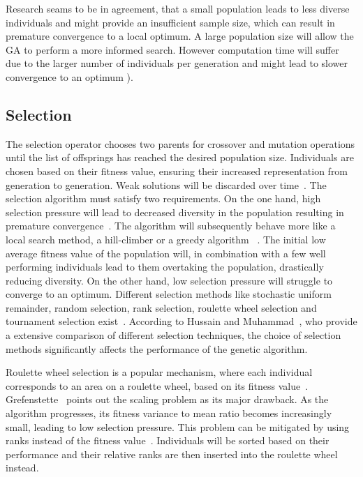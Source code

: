 Research seams to be in agreement, that a small population leads to less diverse individuals and might provide an insufficient sample size, which can result in premature convergence to a local optimum. A large population size will allow the GA to perform a more informed search. However computation time will suffer due to the larger number of individuals per generation and might lead to slower convergence to an optimum \cite{grefenstette_optimization_1986, katoch_review_2021, kacprzyk_parameter_2007}).

\subsection{Selection}
The selection operator chooses two parents for crossover and mutation operations until the list of offsprings has reached the desired population size. Individuals are chosen based on their fitness value, ensuring their increased representation from generation to generation. Weak solutions will be discarded over time~\cite{srinivas_genetic_1994}. The selection algorithm must satisfy two requirements. On the one hand, high selection pressure will lead to decreased diversity in the population resulting in premature convergence~\cite{katoch_review_2021}. The algorithm will subsequently behave more like a local search method, a hill-climber or a greedy algorithm ~\cite{kacprzyk_parameter_2007}. The initial low average fitness value of the population will, in combination with a few well performing individuals lead to them overtaking the population, drastically reducing diversity. On the other hand, low selection pressure will struggle to converge to an optimum. Different selection methods like stochastic uniform remainder, random selection, rank selection, roulette wheel selection and tournament selection exist~\cite{majumdar_genetic_2015}. According to Hussain and Muhammad~\cite{hussain_trade-off_2020}, who provide a extensive comparison of different selection techniques, the choice of selection methods significantly affects the performance of the genetic algorithm.

Roulette wheel selection is a popular mechanism, where each individual corresponds to an area on a roulette wheel, based on its fitness value~\cite{holland_adaptation_1992}. Grefenstette~\cite{grefenstette_optimization_1986} points out the scaling problem as its major drawback. As the algorithm progresses, its fitness variance to mean ratio becomes increasingly small, leading to low selection pressure. This problem can be mitigated by using ranks instead of the fitness value~\cite{katoch_review_2021}. Individuals will be sorted based on their performance and their relative ranks are then inserted into the roulette wheel instead. 

